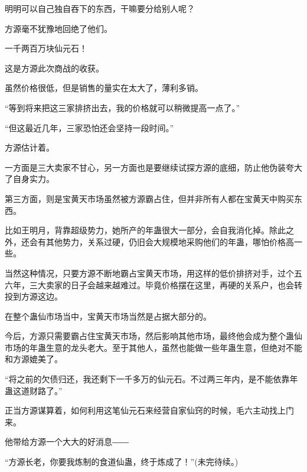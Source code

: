 \begin{this_body}
明明可以自己独自吞下的东西，干嘛要分给别人呢？

方源毫不犹豫地回绝了他们。

一千两百万块仙元石！

这是方源此次商战的收获。

虽然价格很低，但是销售的量实在太大了，薄利多销。

“等到将来把这三家排挤出去，我的价格就可以稍微提高一点了。”

“但这最近几年，三家恐怕还会坚持一段时间。”

方源估计着。

一方面是三大卖家不甘心，另一方面也是要继续试探方源的底细，防止他伪装夸大了自身实力。

第三方面，则是宝黄天市场虽然被方源霸占住，但并非所有人都在宝黄天中购买东西。

比如王明月，背靠超级势力，她所产的年蛊很大一部分，会自我消化掉。除此之外，还会有其他势力，关系过硬，仍旧会大规模地采购他们的年蛊，哪怕价格高一些。

当然这种情况，只要方源不断地霸占宝黄天市场，用这样的低价排挤对手，过个五六年，三大卖家的日子会越来越难过。毕竟价格摆在这里，再硬的关系户，也会转投到方源这边。

在整个蛊仙市场当中，宝黄天市场当然是占据大部分的。

今后，方源只需要霸占住宝黄天市场，然后影响其他市场，最终他会成为整个蛊仙市场的年蛊生意的龙头老大。至于其他人，虽然也能做一些年蛊生意，但绝对不能和方源媲美了。

“将之前的欠债归还，我还剩下一千多万的仙元石。不过两三年内，是不能依靠年蛊这道财路了。”

正当方源谋算着，如何利用这笔仙元石来经营自家仙窍的时候，毛六主动找上门来。

他带给方源一个大大的好消息――

“方源长老，你要我炼制的食道仙蛊，终于炼成了！”(未完待续。)

\end{this_body}

